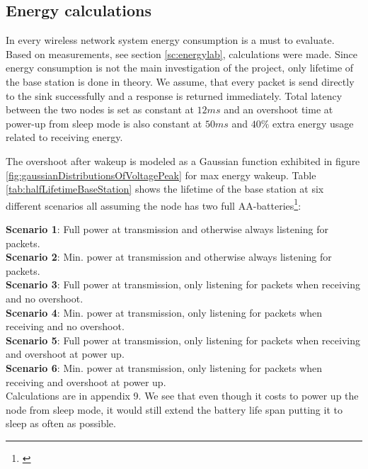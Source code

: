 \subsection{Energy calculations}\label{sc:energyCalculations}

In every wireless network system energy consumption is a must to evaluate. Based on measurements, see section \ref{sc:energylab}, calculations were made. Since energy consumption is not the main investigation of the project, only lifetime of the base station is done in theory. We assume, that every packet is send directly to the sink successfully and a response is returned immediately. Total latency between the two nodes is set as constant at $12 ms$ and an overshoot time at power-up from sleep mode is also constant at $50 ms$ and $40\%$ extra energy usage related to receiving energy.

\noindent The overshoot after wakeup is modeled as a Gaussian function exhibited in figure \ref{fig:gaussianDistributionsOfVoltagePeak} for max energy wakeup. Table \ref{tab:halfLifetimeBaseStation} shows the lifetime of the base station at six different scenarios all assuming the node has two full AA-batteries\footnote{\cite{Wikipedia20180528at1231}}:

\noindent \textbf{Scenario 1}: Full power at transmission and otherwise always listening for packets.\\
\textbf{Scenario 2}: Min. power at transmission and otherwise always listening for packets.\\
\textbf{Scenario 3}: Full power at transmission, only listening for packets when receiving and no overshoot.\\
\textbf{Scenario 4}: Min. power at transmission, only listening for packets when receiving and no overshoot.\\
\textbf{Scenario 5}: Full power at transmission, only listening for packets when receiving and overshoot at power up.\\
\textbf{Scenario 6}: Min. power at transmission, only listening for packets when receiving and overshoot at power up.\\

\noindent Calculations are in appendix 9. We see that even though it costs to power up the node from sleep mode, it would still extend the battery life span putting it to sleep as often as possible.

